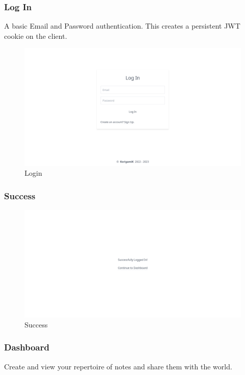 \documentclass[
]{article}
\begin{document}
\hypertarget{log-in}{
  \pagebreak
  \subsubsection{Log In}\label{log-in}
  A basic Email and Password authentication.
  This creates a persistent JWT cookie on the client.
}

\begin{figure}[!h]
  \centering
  \includegraphics{../.github/images/login.png}
  \caption{Login}
\end{figure}

\hypertarget{success}{%
  \subsubsection{Success}\label{success}}

\begin{figure}[!h]
  \centering
  \includegraphics{../.github/images/success.png}
  \caption{Success}
\end{figure}

\hypertarget{dashboard}{%
  \pagebreak
  \subsubsection{Dashboard}\label{dashboard}
  Create and view your repertoire of notes and share them with the world.
}
\end{document}
